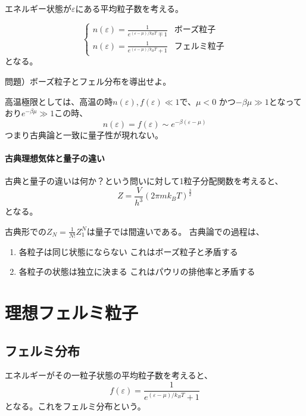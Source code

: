 \documentclass[titlepage]{ltjsarticle}
\begin{document}
エネルギー状態が\(\varepsilon\)にある平均粒子数を考える。

\begin{equation}
  \begin{cases}
    n(\varepsilon)  =  \frac{1}{e^{(\varepsilon-\mu)/k_BT} \mp 1} & \text{ボーズ粒子} \\
    n(\varepsilon)  =  \frac{1}{e^{(\varepsilon-\mu)/k_BT} + 1} & \text{フェルミ粒子}
  \end{cases}
\end{equation}
となる。

問題）ボーズ粒子とフェル分布を導出せよ。

高温極限としては、高温の時\(n(\varepsilon),f(\varepsilon)\ll 1\)で、\(\mu<0\) かつ\(-\beta \mu \gg 1\)となっており\(e^{-\beta \mu} \gg 1\)この時、
\begin{equation}
  n(\varepsilon) = f(\varepsilon) \sim e^{-\beta(\varepsilon-\mu)}
\end{equation}
つまり古典論と一致に量子性が現れない。

\paragraph{古典理想気体と量子の違い}
古典と量子の違いは何か？という問いに対して1粒子分配関数を考えると、
\begin{equation}
  Z = \frac{V}{h^3} (2 \pi mk_BT)^{\frac{3}{2}}
\end{equation}
となる。

古典形での\(Z_N = \frac{1}{N!}Z_1^N\)は量子では間違いである。
古典論での過程は、
\begin{enumerate}
  \item 各粒子は同じ状態にならない これはボーズ粒子と矛盾する
  \item 各粒子の状態は独立に決まる これはパウリの排他率と矛盾する
\end{enumerate}

\section{理想フェルミ粒子}
\subsection{フェルミ分布}
エネルギーがその一粒子状態の平均粒子数を考えると、
\begin{equation}
  f(\varepsilon) = \frac{1}{e^{(\varepsilon-\mu)/k_BT}+1}
\end{equation}
となる。これをフェルミ分布という。
\end{document}
